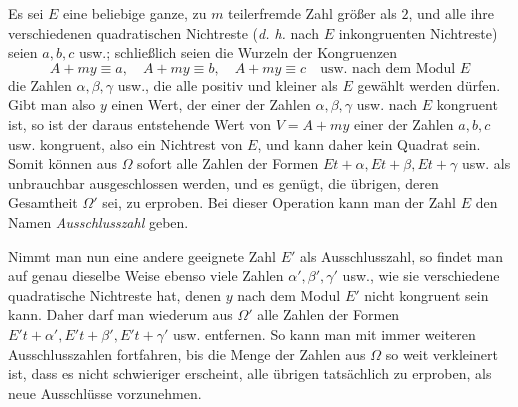 Es sei \(E\) eine beliebige ganze, zu \(m\) teilerfremde Zahl größer als \(2\), und alle ihre verschiedenen quadratischen Nichtreste (\textit{d. h.} nach \(E\) inkongruenten Nichtreste) seien \(a,\allowbreak b,\allowbreak c\) usw.;
schließlich seien die Wurzeln der Kongruenzen
\[A+my\equiv a,\quad A+my\equiv b,\quad A+my\equiv c\quad\text{usw. nach dem Modul }E\]
die Zahlen \(\alpha,\allowbreak \beta,\allowbreak \gamma\) usw., die alle positiv und kleiner als \(E\) gewählt werden dürfen. Gibt man also \(y\) einen Wert, der einer der Zahlen \(\alpha,\allowbreak \beta,\allowbreak \gamma\) usw. nach \(E\) kongruent ist, so ist der daraus entstehende Wert von \(V=A+my\) einer der Zahlen \(a,\allowbreak b,\allowbreak c\) usw. kongruent, also ein Nichtrest von \(E\), und kann daher kein Quadrat sein. Somit können aus \(\Omega\) sofort alle Zahlen der Formen \(Et+\alpha,\allowbreak Et+\beta,\allowbreak Et+\gamma\) usw. als unbrauchbar ausgeschlossen werden, und es genügt, die übrigen, deren Gesamtheit \(\Omega'\) sei, zu erproben. Bei dieser Operation kann man der Zahl \(E\) den Namen \textit{Ausschlusszahl} geben.

Nimmt man nun eine andere geeignete Zahl \(E'\) als Ausschlusszahl, so findet man auf genau dieselbe Weise ebenso viele Zahlen \(\alpha',\allowbreak \beta',\allowbreak \gamma'\) usw., wie sie verschiedene quadratische Nichtreste hat, denen \(y\) nach dem Modul \(E'\) nicht kongruent sein kann. Daher darf man wiederum aus \(\Omega'\) alle Zahlen der Formen \(E't+\alpha',\allowbreak E't+\beta',\allowbreak E't+\gamma'\) usw. entfernen. So kann man mit immer weiteren Ausschlusszahlen fortfahren, bis die Menge der Zahlen aus \(\Omega\) so weit verkleinert ist, dass es nicht schwieriger erscheint, alle übrigen tatsächlich zu erproben, als neue Ausschlüsse vorzunehmen.

